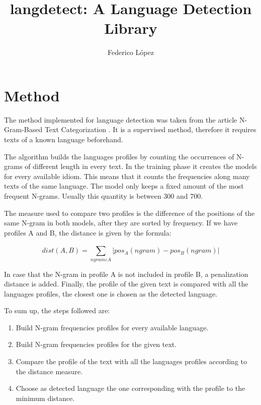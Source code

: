 \documentclass{llncs}
\begin{document}
\frontmatter

\title{langdetect: A Language Detection Library}

\author{Federico López}

\maketitle

\section{Method}
The method implemented for language detection was taken from the article N-Gram-Based Text Categorization \cite{n-gram-basedtext}. It is a supervised method, therefore it requires texts of a known language beforehand.

The algorithm builds the languages profiles by counting the occurrences of N-grams of different length in every text. In the training phase it creates the models for every available idiom. This means that it counts the frequencies along many texts of the same language. The model only keeps a fixed amount of the most frequent N-grams. Usually this quantity is between 300 and 700. 

The measure used to compare two profiles is the difference of the positions of the same N-gram in both models, after they are sorted by frequency. If we have profiles A and B, the distance is given by the formula:

\begin{equation}
dist(A,B) = \sum_{ngram \varepsilon A}^{} | pos_{A}(ngram) - pos_{B}(ngram) | 
\end{equation}

In case that the N-gram in profile A is not included in profile B, a penalization distance is added.
Finally, the profile of the given text is compared with all the languages profiles, the closest one is chosen as the detected language.

To sum up, the steps followed are:
\begin{enumerate}
	\item Build N-gram frequencies profiles for every available language.
	\item Build N-gram frequencies profiles for the given text.
	\item Compare the profile of the text with all the languages profiles according to the distance measure.
	\item Choose as detected language the one corresponding with the profile to the minimum distance.
\end{enumerate}
\end{document}
